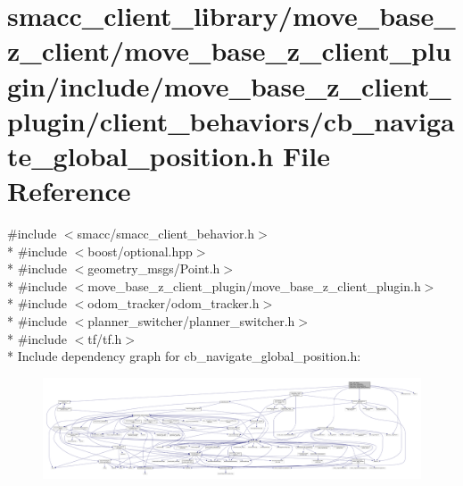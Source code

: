 \hypertarget{smacc__client__library_2move__base__z__client_2move__base__z__client__plugin_2include_2move__base314f1b987667b08527fd8e96cdcf0a7}{}\section{smacc\+\_\+client\+\_\+library/move\+\_\+base\+\_\+z\+\_\+client/move\+\_\+base\+\_\+z\+\_\+client\+\_\+plugin/include/move\+\_\+base\+\_\+z\+\_\+client\+\_\+plugin/client\+\_\+behaviors/cb\+\_\+navigate\+\_\+global\+\_\+position.h File Reference}
\label{smacc__client__library_2move__base__z__client_2move__base__z__client__plugin_2include_2move__base314f1b987667b08527fd8e96cdcf0a7}
{\ttfamily \#include $<$smacc/smacc\+\_\+client\+\_\+behavior.\+h$>$}\\*
{\ttfamily \#include $<$boost/optional.\+hpp$>$}\\*
{\ttfamily \#include $<$geometry\+\_\+msgs/\+Point.\+h$>$}\\*
{\ttfamily \#include $<$move\+\_\+base\+\_\+z\+\_\+client\+\_\+plugin/move\+\_\+base\+\_\+z\+\_\+client\+\_\+plugin.\+h$>$}\\*
{\ttfamily \#include $<$odom\+\_\+tracker/odom\+\_\+tracker.\+h$>$}\\*
{\ttfamily \#include $<$planner\+\_\+switcher/planner\+\_\+switcher.\+h$>$}\\*
{\ttfamily \#include $<$tf/tf.\+h$>$}\\*
Include dependency graph for cb\+\_\+navigate\+\_\+global\+\_\+position.\+h\+:
\nopagebreak
\begin{figure}[H]
\begin{center}
\leavevmode
\includegraphics[width=350pt]{smacc__client__library_2move__base__z__client_2move__base__z__client__plugin_2include_2move__bas388614a3b8d70d53c10a4453269c05b2}
\end{center}
\end{figure}

